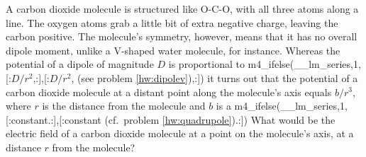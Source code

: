 A carbon dioxide molecule is structured like O-C-O, with all three
atoms along a line. The oxygen atoms grab a little bit of extra
negative charge, leaving the carbon positive.  The molecule's
symmetry, however, means that it has no overall dipole moment, unlike
a V-shaped water molecule, for instance.  Whereas the potential of a
dipole of magnitude $D$ is proportional to 
m4_ifelse(__lm_series,1,[:$D/r^2$,:],[:$D/r^2$, (see problem \ref{hw:dipolev}),:])
it turns out that the potential of a carbon dioxide
molecule at a distant point along the molecule's axis equals $b/r^3$,
where $r$ is the distance from the molecule and $b$ is a
m4_ifelse(__lm_series,1,[:constant.:],[:constant (cf.~problem \ref{hw:quadrupole}).:])
What would be the electric field of a
carbon dioxide molecule at a point on the molecule's axis, at a
distance $r$ from the molecule?\answercheck

